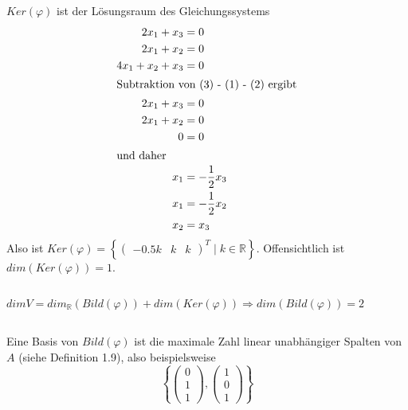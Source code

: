 \documentclass{../mfa}
\begin{document}
\subsection{}
$Ker(\varphi)$ ist der Lösungsraum des Gleichungssystems
\begin{align}
   2x_1     +  x_3  &=  0 \\
   2x_1  +  x_2    &=  0 \\
   4x_1  +  x_2  +  x_3  &=  0 \\
   \intertext{Subtraktion von (3) - (1) - (2) ergibt}
   \nonumber 2x_1     +  x_3  &=  0 \\
   \nonumber 2x_1  +  x_2    &=  0 \\
   \nonumber 0      &=  0 \\
   \intertext{und daher}
   \nonumber x_1 &= -\frac{1}{2}x_3 \\
   \nonumber x_1 &= -\frac{1}{2}x_2 \\
   \nonumber x_2 &= x_3
\end{align}
Also ist $Ker(\varphi) = \left\{\begin{pmatrix} -0.5k & k & k \end{pmatrix}^T \mid k \in
\mathbb{R}\right\}$. Offensichtlich ist $dim(Ker(\varphi)) = 1$.

\subsection{}

$dim V = dim_\mathbb{R}(Bild(\varphi)) + dim(Ker(\varphi)) \Rightarrow dim(Bild(\varphi)) = 2$

\subsection{}

Eine Basis von $Bild(\varphi)$ ist die maximale Zahl linear unabhängiger Spalten
von $A$ (siehe Definition 1.9), also beispielsweise 
\begin{equation*}
   \left\{
      \begin{pmatrix}
         0 \\ 1 \\ 1
      \end{pmatrix},
      \begin{pmatrix}
         1 \\ 0 \\ 1
      \end{pmatrix}
   \right\}
\end{equation*}
\end{document}
